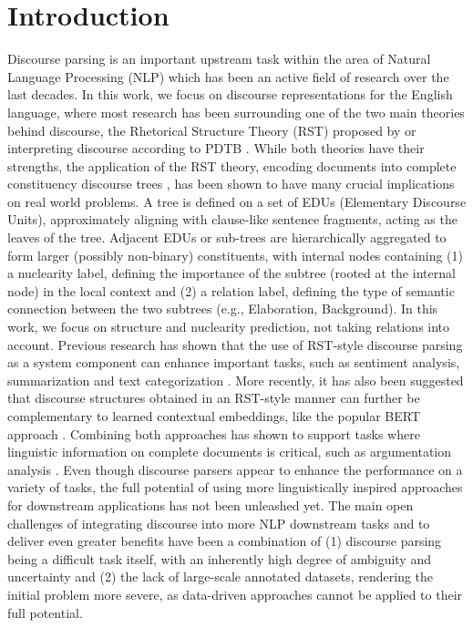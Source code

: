 \documentclass[11pt]{article}
\begin{document}
\section{Introduction}
Discourse parsing is an important upstream task within the area of Natural Language Processing (NLP) 
which has been an active field of research over the last decades. In this work, we focus on discourse representations for the English language, where most research has been surrounding one of the two main theories behind discourse, the Rhetorical Structure Theory (RST) proposed by  or interpreting discourse according to PDTB \cite{prasadpenn}. While both theories have their strengths, the application of the RST theory, encoding documents into complete constituency discourse trees \cite{morey2018dependency}, has been shown to have many crucial implications on real world problems. A tree is defined on a set of EDUs (Elementary Discourse Units), approximately aligning with clause-like sentence fragments, acting as the leaves of the tree. Adjacent EDUs or sub-trees are hierarchically aggregated to form larger (possibly non-binary) constituents, with internal nodes containing (1) a nuclearity label, defining the importance of the subtree (rooted at the internal node) in the local context and (2) a relation label, defining the type of semantic connection between the two subtrees (e.g., Elaboration, Background). In this work, we focus on structure and nuclearity prediction, not taking relations into account. Previous research has shown that the use of RST-style discourse parsing as a system component can enhance important tasks, such as sentiment analysis, summarization and text categorization \cite{bhatia2015better,nejat2017exploring,hogenboom2015using,gerani2014abstractive,ji2017neural}. More recently, it has also been suggested that discourse structures obtained in an RST-style manner can further be complementary to learned contextual embeddings, like the popular 
BERT approach \cite{devlin2018bert}. Combining both approaches has shown to support tasks where linguistic information on complete documents
is critical, such as argumentation analysis \cite{chakrabarty2019ampersand}. 
Even though discourse parsers appear to enhance the performance on a variety of tasks, the full potential of using more linguistically inspired approaches for downstream applications has not been unleashed yet. The main open challenges of integrating discourse into more NLP downstream tasks and to deliver even greater benefits have been a combination of (1) discourse parsing being a difficult task itself, with an inherently high degree of ambiguity and uncertainty and (2) the lack of large-scale annotated datasets, rendering the initial problem more severe, as data-driven approaches cannot be applied to their full potential.
\end{document}
